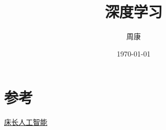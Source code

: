\documentclass[UTF-8]{article} %
\title{深度学习}
\author{周康}
\date{\today}
\begin{document}
	\maketitle
	\tableofcontents
	\section{参考}
	\href{https://captainbed.vip/}{床长人工智能}
	
	
	
	
	
\end{document}
